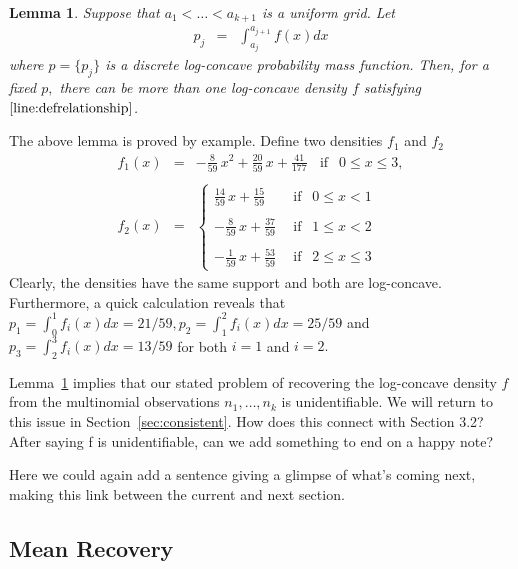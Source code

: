 \documentclass[12pt]{article} %
\newtheorem{lemma}[theorem]{Lemma}
\newcommand{\comC}[1]{{\noindent  \color{orange}#1}}
\begin{document}
\begin{lemma}\label{lem:unID}
Suppose that $a_1 < \ldots < a_{k+1}$ is a uniform grid.   Let 
\begin{eqnarray}\label{line:defrelationship}
p_j&=&\int_{a_j}^{a_{j+1}} f(x)dx
\end{eqnarray}
where $p=\{p_j\}$ is a discrete log-concave probability mass function.   Then, for a fixed $p,$ there can be more than one log-concave density $f$ satisfying $\eqref{line:defrelationship}$.
\end{lemma}
The above lemma is proved by example.  Define two densities $f_1$ and $f_2$ 
\begin{eqnarray*}
f_1(x) &=& -\frac{8}{59}\, x^2 + \frac{20}{59}\,x + \frac{41}{177} \ \ \ \ \text{if } \ \ 0\leq x \leq 3,\\\\
f_2(x) &=& \left\{
\begin{array}{ll}
     \frac{14}{59} \,x + \frac{15}{59} & \ \ \text{if } \ \ 0 \leq x < 1 \\\\
    -\frac{8}{59}\,x + \frac{37}{59}  & \ \ \text{if } \ \ 1 \leq x < 2 \\\\
    -\frac{1}{59}\,x + \frac{53}{59} & \ \ \text{if } \ \ 2 \leq x \leq 3
\end{array} \right.
 \end{eqnarray*}
Clearly, the densities have the same support and both are log-concave.   Furthermore, a quick calculation reveals that $p_1=\int_0^1 f_i(x)dx = 21/59, p_2=\int_1^2 f_i(x)dx = 25/59$ and $p_3=\int_2^3 f_i(x)dx = 13/59$ for both $i=1$ and $i=2.$

Lemma~\ref{lem:unID} implies that our stated problem of recovering the log-concave density $f$ from the multinomial observations $n_1, \ldots, n_k$ is unidentifiable.  We will return to this issue in Section~\ref{sec:consistent}.   \comC{How does this connect with Section 3.2? After saying f is unidentifiable, can we add something to end on a happy note?}

\comC{Here we could again add a sentence giving a glimpse of what's coming next, making this link between the current and next section.}

\bigskip

\subsection{Mean Recovery}
\end{document}
